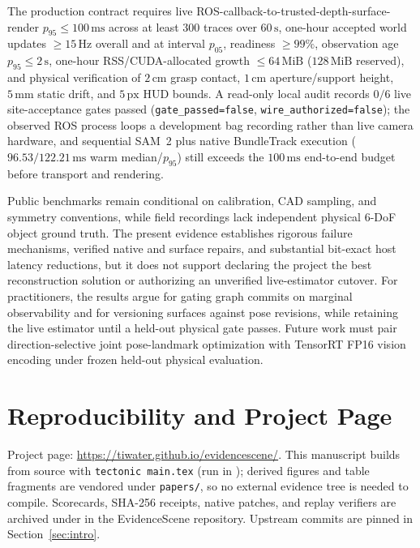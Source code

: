 \documentclass[10pt,journal]{IEEEtran}
\begin{document}
The production contract requires live ROS-callback-to-trusted-depth-surface-render $p_{95}\le 100\,\mathrm{ms}$ across at least $300$ traces over $60\,\mathrm{s}$, one-hour accepted world updates $\ge 15\,\mathrm{Hz}$ overall and at interval $p_{05}$, readiness $\ge 99\%$, observation age $p_{95}\le 2\,\mathrm{s}$, one-hour RSS/CUDA-allocated growth $\le 64\,\mathrm{MiB}$ ($128\,\mathrm{MiB}$ reserved), and physical verification of $2\,\mathrm{cm}$ grasp contact, $1\,\mathrm{cm}$ aperture/support height, $5\,\mathrm{mm}$ static drift, and $5\,\mathrm{px}$ HUD bounds. A read-only local audit records $0/6$ live site-acceptance gates passed (\texttt{gate\_passed=false}, \texttt{wire\_authorized=false}); the observed ROS process loops a development bag recording rather than live camera hardware, and sequential SAM~2 plus native BundleTrack execution ($96.53/122.21\,\mathrm{ms}$ warm median/$p_{95}$) still exceeds the $100\,\mathrm{ms}$ end-to-end budget before transport and rendering.

Public benchmarks remain conditional on calibration, CAD sampling, and symmetry conventions, while field recordings lack independent physical 6-DoF object ground truth. The present evidence establishes rigorous failure mechanisms, verified native and surface repairs, and substantial bit-exact host latency reductions, but it does not support declaring the project the best reconstruction solution or authorizing an unverified live-estimator cutover. For practitioners, the results argue for gating graph commits on marginal observability and for versioning surfaces against pose revisions, while retaining the live estimator until a held-out physical gate passes. Future work must pair direction-selective joint pose-landmark optimization with TensorRT FP16 vision encoding under frozen held-out physical evaluation.

\section*{Reproducibility and Project Page}
Project page: \url{https://tiwater.github.io/evidencescene/}. This manuscript builds from source with \texttt{tectonic main.tex} (run in ); derived figures and table fragments are vendored under \texttt{papers/}, so no external evidence tree is needed to compile. Scorecards, SHA-256 receipts, native patches, and replay verifiers are archived under  in the EvidenceScene repository. Upstream commits are pinned in Section~\ref{sec:intro}.
\end{document}
